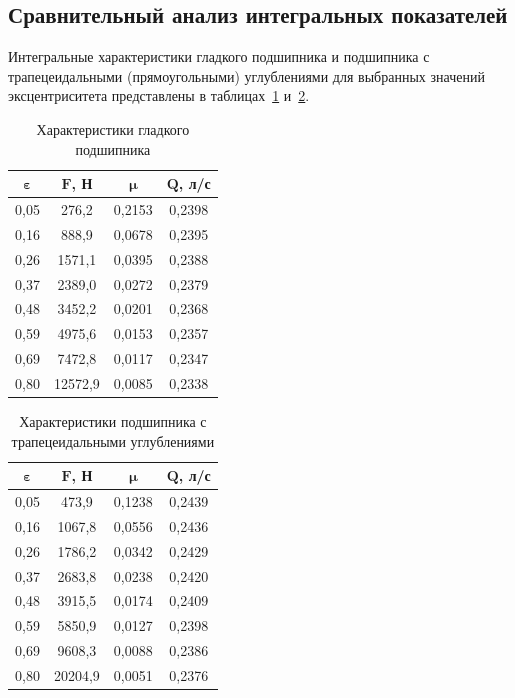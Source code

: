 \subsection{Сравнительный анализ интегральных показателей}

Интегральные характеристики гладкого подшипника и подшипника с трапецеидальными (прямоугольными) углублениями для выбранных значений эксцентриситета представлены в таблицах~\ref{tab:smooth_results} и~\ref{tab:textured_results}.

\begin{table}[H]
\small
\centering
\caption{Характеристики гладкого подшипника}
\label{tab:smooth_results}
\begin{tabular}{|c|c|c|c|}
\hline
$\boldsymbol{\varepsilon}$ & $\boldsymbol{F}$\textbf{, Н} & $\boldsymbol{\mu}$ & $\boldsymbol{Q}$\textbf{, л/с} \\
\hline
0{,}05 & 276{,}2 & 0{,}2153 & 0{,}2398 \\
\hline
0{,}16 & 888{,}9 & 0{,}0678 & 0{,}2395 \\
\hline
0{,}26 & 1571{,}1 & 0{,}0395 & 0{,}2388 \\
\hline
0{,}37 & 2389{,}0 & 0{,}0272 & 0{,}2379 \\
\hline
0{,}48 & 3452{,}2 & 0{,}0201 & 0{,}2368 \\
\hline
0{,}59 & 4975{,}6 & 0{,}0153 & 0{,}2357 \\
\hline
0{,}69 & 7472{,}8 & 0{,}0117 & 0{,}2347 \\
\hline
0{,}80 & 12572{,}9 & 0{,}0085 & 0{,}2338 \\
\hline
\end{tabular}
\end{table}

\begin{table}[H]
\small
\centering
\caption{Характеристики подшипника с трапецеидальными углублениями}
\label{tab:textured_results}
\begin{tabular}{|c|c|c|c|}
\hline
$\boldsymbol{\varepsilon}$ & $\boldsymbol{F}$\textbf{, Н} & $\boldsymbol{\mu}$ & $\boldsymbol{Q}$\textbf{, л/с} \\
\hline
0{,}05 & 473{,}9 & 0{,}1238 & 0{,}2439 \\
\hline
0{,}16 & 1067{,}8 & 0{,}0556 & 0{,}2436 \\
\hline
0{,}26 & 1786{,}2 & 0{,}0342 & 0{,}2429 \\
\hline
0{,}37 & 2683{,}8 & 0{,}0238 & 0{,}2420 \\
\hline
0{,}48 & 3915{,}5 & 0{,}0174 & 0{,}2409 \\
\hline
0{,}59 & 5850{,}9 & 0{,}0127 & 0{,}2398 \\
\hline
0{,}69 & 9608{,}3 & 0{,}0088 & 0{,}2386 \\
\hline
0{,}80 & 20204{,}9 & 0{,}0051 & 0{,}2376 \\
\hline
\end{tabular}
\end{table}

